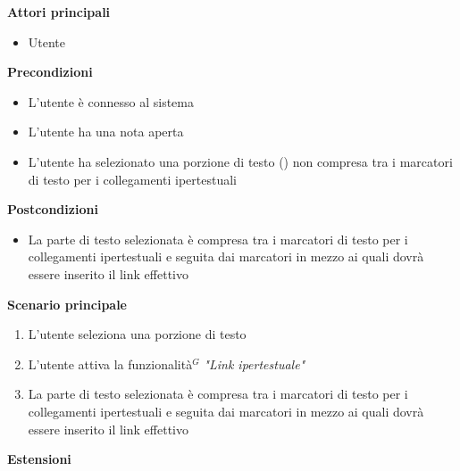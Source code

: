 \documentclass[a4paper,10pt]{article}
\begin{document}
    \textbf{Attori principali}
    \begin{itemize}
        \item Utente
    \end{itemize}
    \textbf{Precondizioni}
    \begin{itemize}
        \item L'utente è connesso al sistema
        \item L'utente ha una nota aperta
        \item L'utente ha selezionato una porzione di testo () non compresa tra i marcatori di testo per i collegamenti ipertestuali
    \end{itemize}
    \textbf{Postcondizioni}
    \begin{itemize}
        \item La parte di testo selezionata è compresa tra i marcatori di testo per i collegamenti ipertestuali e seguita dai marcatori in mezzo ai quali dovrà essere inserito il link effettivo
    \end{itemize}
    \textbf{Scenario principale}
    \begin{enumerate}
        \item L'utente seleziona una porzione di testo
        \item L'utente attiva la funzionalità$^G$ \textit{"Link ipertestuale"}
        \item La parte di testo selezionata è compresa tra i marcatori di testo per i collegamenti ipertestuali e seguita dai marcatori in mezzo ai quali dovrà essere inserito il link effettivo
    \end{enumerate}
    \textbf{Estensioni}
\end{document}
